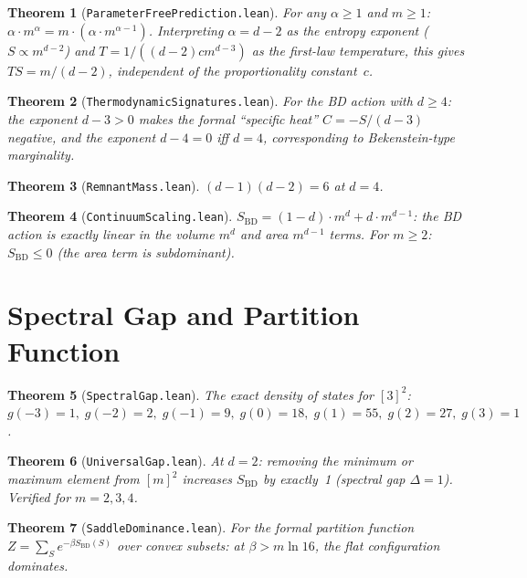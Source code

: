 \documentclass[11pt,a4paper]{article}
\newtheorem{theorem}{Theorem}[section]
\theoremstyle{remark}
\begin{document}
\begin{theorem}[\texttt{ParameterFreePrediction.lean}]
\label{thm:ts}
For any $\alpha \geq 1$ and $m \geq 1$:
$\alpha \cdot m^\alpha = m \cdot (\alpha \cdot m^{\alpha-1})$.
Interpreting $\alpha = d{-}2$ as the entropy exponent ($S \propto m^{d-2}$)
and $T = 1/((d{-}2) c m^{d-3})$ as the first-law temperature, this gives
$TS = m/(d{-}2)$, independent of the proportionality constant~$c$.
\end{theorem}

\begin{theorem}[\texttt{ThermodynamicSignatures.lean}]
For the BD action with $d \geq 4$: the exponent $d{-}3 > 0$ makes the
formal ``specific heat'' $C = -S/(d{-}3)$ negative, and the exponent
$d{-}4 = 0$ iff $d = 4$, corresponding to Bekenstein-type marginality.
\end{theorem}

\begin{theorem}[\texttt{RemnantMass.lean}]
$(d{-}1)(d{-}2) = 6$ at $d = 4$.
\end{theorem}

\begin{theorem}[\texttt{ContinuumScaling.lean}]
$S_{\mathrm{BD}} = (1{-}d) \cdot m^d + d \cdot m^{d-1}$: the BD action
is exactly linear in the volume $m^d$ and area $m^{d-1}$ terms.
For $m \geq 2$: $S_{\mathrm{BD}} \leq 0$ (the area term is subdominant).
\end{theorem}

\section{Spectral Gap and Partition Function}

\begin{theorem}[\texttt{SpectralGap.lean}]
The exact density of states for $[3]^2$:
$g({-}3)=1,\; g({-}2)=2,\; g({-}1)=9,\; g(0)=18,\;
g(1)=55,\; g(2)=27,\; g(3)=1$.
\end{theorem}

\begin{theorem}[\texttt{UniversalGap.lean}]
At $d = 2$: removing the minimum or maximum element from $[m]^2$ increases
$S_{\mathrm{BD}}$ by exactly~1 (spectral gap $\Delta = 1$).
Verified for $m = 2, 3, 4$.
\end{theorem}

\begin{theorem}[\texttt{SaddleDominance.lean}]
For the formal partition function $Z = \sum_{S} e^{-\beta S_{\mathrm{BD}}(S)}$
over convex subsets: at $\beta > m\ln 16$, the flat configuration dominates.
\end{theorem}
\end{document}
